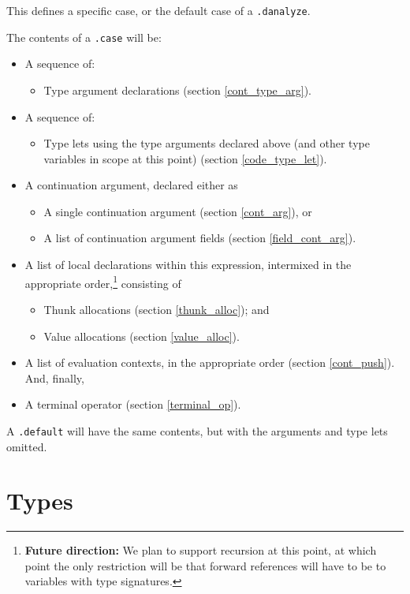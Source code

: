\documentclass{report}
\newcommand\stringcode[1]{\texttt{#1}}
\newcommand\future[1]{\footnote{\textbf{Future direction:} #1}}
\begin{document}
This defines a specific case, or the default case of a \stringcode{.danalyze}.

The contents of a \stringcode{.case} will be:
\begin{itemize}
    \item A sequence of:
        \begin{itemize}
            \item Type argument declarations (section \ref{cont_type_arg}).
        \end{itemize}
    \item A sequence of:
        \begin{itemize}
            \item Type lets using the type arguments declared above (and other type variables in scope at this point) (section \ref{code_type_let}).
        \end{itemize}
    \item A continuation argument, declared either as
        \begin{itemize}
            \item A single continuation argument (section \ref{cont_arg}), or
            \item A list of continuation argument fields (section \ref{field_cont_arg}).
        \end{itemize}
    \item A list of local declarations within this expression,
        intermixed in the appropriate order,\future{We plan to support recursion at this point, at which point the only restriction will be that forward references will have to be to variables with type signatures.}
        consisting of
        \begin{itemize}
            \item Thunk allocations (section \ref{thunk_alloc}); and
            \item Value allocations (section \ref{value_alloc}).
        \end{itemize}
    \item A list of evaluation contexts, in the appropriate order (section \ref{cont_push}).
        And, finally,
    \item A terminal operator (section \ref{terminal_op}).
\end{itemize}
A \stringcode{.default} will have the same contents, but with the arguments and type lets omitted.

\chapter{Types}
\end{document}
